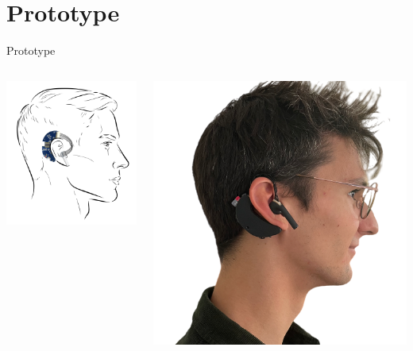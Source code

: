 \documentclass[en]{sdqbeamer}
\begin{document}
\section{Prototype}
\begin{frame}{Prototype}
  \begin{columns}[T] %
    \begin{column}{.48\textwidth} %
      \includegraphics[width=0.7\linewidth]{../thesis-doc/images/prototype/prototype_on_head_visual.png} %
    \end{column}
    
    \begin{column}{.48\textwidth} %
      \includegraphics[width=0.75\linewidth]{../thesis-doc/images/prototype/Lorenz.png} %
    \end{column}
  \end{columns}
\end{frame}
\end{document}
